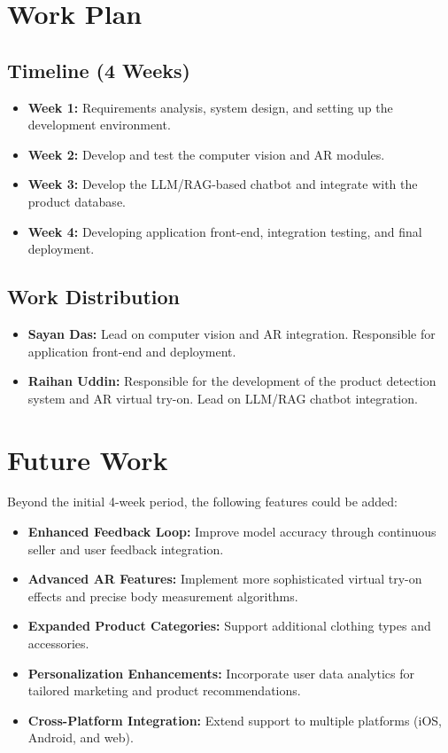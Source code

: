 \chapter{Work Plan}

\section{Timeline (4 Weeks)}
\begin{itemize}
    \item \textbf{Week 1:} Requirements analysis, system design, and setting up the development environment.
    \item \textbf{Week 2:} Develop and test the computer vision and AR modules.
    \item \textbf{Week 3:} Develop the LLM/RAG-based chatbot and integrate with the product database.
    \item \textbf{Week 4:} Developing application front-end, integration testing, and final deployment.
\end{itemize}

\section{Work Distribution}
\begin{itemize}
    \item \textbf{Sayan Das:} Lead on computer vision and AR integration. Responsible for application front-end and deployment.
    \item \textbf{Raihan Uddin:} Responsible for the development of the product detection system and AR virtual try-on. Lead on LLM/RAG chatbot integration.
\end{itemize}

\chapter{Future Work}
Beyond the initial 4-week period, the following features could be added:
\begin{itemize}
    \item \textbf{Enhanced Feedback Loop:} Improve model accuracy through continuous seller and user feedback integration.
    \item \textbf{Advanced AR Features:} Implement more sophisticated virtual try-on effects and precise body measurement algorithms.
    \item \textbf{Expanded Product Categories:} Support additional clothing types and accessories.
    \item \textbf{Personalization Enhancements:} Incorporate user data analytics for tailored marketing and product recommendations.
    \item \textbf{Cross-Platform Integration:} Extend support to multiple platforms (iOS, Android, and web).
\end{itemize}

